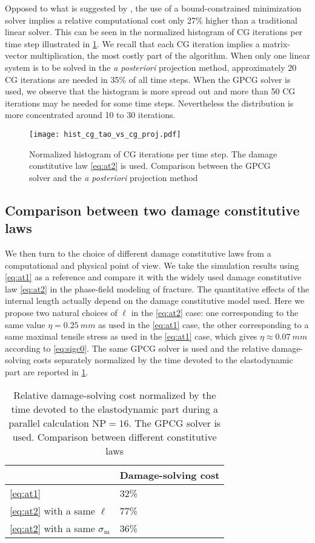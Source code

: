 Opposed to what is suggested by \cite{AmorMarigoMaurini:2009}, the use of a bound-constrained minimization solver implies a relative computational cost only 27\% higher than a traditional linear solver. This can be seen in the normalized histogram of CG iterations per time step illustrated in \cref{fig:histcg}. We recall that each CG iteration implies a matrix-vector multiplication, the most costly part of the algorithm. When only one linear system is to be solved in the \emph{a posteriori} projection method, approximately 20 CG iterations are needed in 35\% of all time steps. When the GPCG solver is used, we observe that the histogram is more spread out and more than 50 CG iterations may be needed for some time steps. Nevertheless the distribution is more concentrated around 10 to 30 iterations.
\begin{figure}[htbp]
\centering
\texttt{[image: hist\_cg\_tao\_vs\_cg\_proj.pdf]}
\caption{Normalized histogram of CG iterations per time step. The damage constitutive law \eqref{eq:at2} is used. Comparison between the GPCG solver and the \emph{a posteriori} projection method} \label{fig:histcg}
\end{figure}

\subsection{Comparison between two damage constitutive laws}
We then turn to the choice of different damage constitutive laws from a computational and physical point of view. We take the simulation results using \eqref{eq:at1} as a reference and compare it with the widely used damage constitutive law \eqref{eq:at2} in the phase-field modeling of fracture. The quantitative effects of the internal length actually depend on the damage constitutive model used. Here we propose two natural choices of $\ell$ in the \eqref{eq:at2} case: one corresponding to the same value $\eta=\SI{0.25}{mm}$ as used in the \eqref{eq:at1} case, the other corresponding to a same maximal tensile stress as used in the \eqref{eq:at1} case, which gives $\eta\approx\SI{0.07}{mm}$ according to \eqref{eq:sigc0}. The same GPCG solver is used and the relative damage-solving costs separately normalized by the time devoted to the elastodynamic part are reported in \cref{tab:at1_vs_at2}.
\begin{table}[htbp]
\centering
\caption{Relative damage-solving cost normalized by the time devoted to the elastodynamic part during a parallel calculation $\mathrm{NP}=16$. The GPCG solver is used. Comparison between different constitutive laws} \label{tab:at1_vs_at2}
\begin{tabular}{ll} \toprule
& Damage-solving cost  \\ \midrule
\eqref{eq:at1} & 32\% \\
\eqref{eq:at2} with a same $\ell$ & 77\% \\
\eqref{eq:at2} with a same $\sigma_\mathrm{m}$ & 36\% \\ \bottomrule
\end{tabular}
\end{table}

